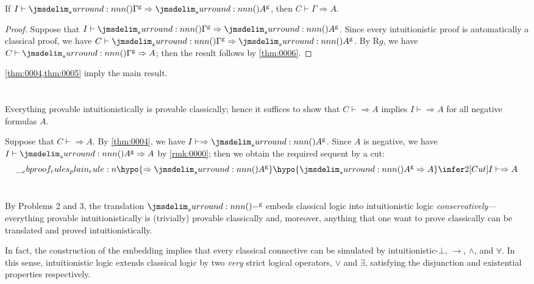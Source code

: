 \documentclass[a4paper]{article}
\newcommand{\gtrans}[1]{\prn{#1}^{\mathrm{g}}}
\begin{document}
\begin{proposition}\label{thm:0005}
  If $I \vdash \gtrans{\Gamma} \Rightarrow \gtrans{A}$, then $C \vdash \Gamma \Rightarrow A$.
\end{proposition}
\begin{proof}
  Suppose that $I \vdash \gtrans{\Gamma} \Rightarrow \gtrans{A}$.
  Since every intuitionistic proof is automatically a classical proof, we have $C \vdash \gtrans{\Gamma} \Rightarrow \gtrans{A}$.
  By R$g$, we have $C \vdash \gtrans{\Gamma} \Rightarrow A$; then the result follows by \cref{thm:0006}.
\end{proof}

\cref{thm:0004,thm:0005} imply the main result.

\section{}

Everything provable intuitionistically is provable classically; hence it suffices to show that $C \vdash \Rightarrow A$ implies $I \vdash \Rightarrow A$ for all negative formulas $A$.

Suppose that $C \vdash \Rightarrow A$.
By \cref{thm:0004}, we have $I \vdash \Rightarrow \gtrans{A}$.
Since $A$ is negative, we have $I \vdash \gtrans{A} \Rightarrow A$ by \cref{rmk:0000}; then we obtain the required sequent by a cut:
\[
  \ebrule{
    \hypo{\Rightarrow \gtrans{A}}
    \hypo{\gtrans{A} \Rightarrow A}
    \infer2[Cut]{I \vdash \Rightarrow A}
  }
\]

\section{}

By Problems 2 and 3, the translation $\gtrans{-}$ embeds classical logic into intuitionistic logic \emph{conservatively}---everything provable intuitionistically is (trivially) provable classically and, moreover, anything that one want to prove classically can be translated and proved intuitionistically.

In fact, the construction of the embedding implies that every classical connective can be simulated by intuitionistic-$\bot$, $\to$, $\wedge$, and $\forall$.
In this sense, intuitionistic logic extends classical logic by two \emph{very} strict logical operators, $\vee$ and $\exists$, satisfying the disjunction and existential properties respectively.

% 
% 
\end{document}
